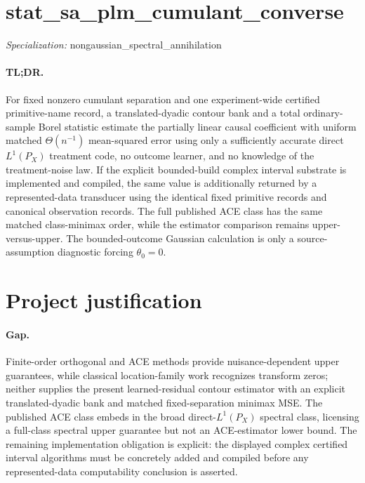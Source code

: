 \documentclass{article}
\begin{document}
\sloppy

\section*{stat\_\allowbreak{}sa\_\allowbreak{}plm\_\allowbreak{}cumulant\_\allowbreak{}converse}

\noindent\textit{Specialization:} nongaussian\_\allowbreak{}spectral\_\allowbreak{}annihilation\par

\paragraph{TL;DR.} For fixed nonzero cumulant separation and one experiment-wide certified primitive-name record, a translated-dyadic contour bank and a total ordinary-sample Borel statistic estimate the partially linear causal coefficient with uniform matched \(\Theta(n^{-1})\) mean-squared error using only a sufficiently accurate direct \(L^1(P_X)\) treatment code, no outcome learner, and no knowledge of the treatment-noise law. If the explicit bounded-build complex interval substrate is implemented and compiled, the same value is additionally returned by a represented-data transducer using the identical fixed primitive records and canonical observation records. The full published ACE class has the same matched class-minimax order, while the estimator comparison remains upper-versus-upper. The bounded-outcome Gaussian calculation is only a source-assumption diagnostic forcing \(\theta_0=0\).

\section{Project justification}

\paragraph{Gap.} Finite-order orthogonal and ACE methods provide nuisance-dependent upper guarantees, while classical location-family work recognizes transform zeros; neither supplies the present learned-residual contour estimator with an explicit translated-dyadic bank and matched fixed-separation minimax MSE. The published ACE class embeds in the broad direct-\(L^1(P_X)\) spectral class, licensing a full-class spectral upper guarantee but not an ACE-estimator lower bound. The remaining implementation obligation is explicit: the displayed complex certified interval algorithms must be concretely added and compiled before any represented-data computability conclusion is asserted.
\end{document}
